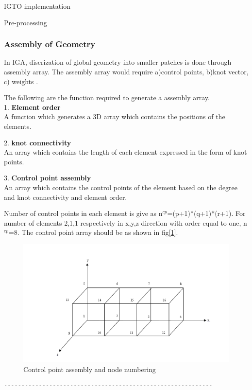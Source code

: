 \documentclass[a4paper,12pt,times]{article}
\begin{document}
\begin{section}{IGTO implementation}
\begin{subsection}{Pre-processing}
\subsubsection{Assembly of Geometry}
In IGA, discrization of global geometry into smaller patches is done through assembly array. The assembly array would require a)control points, b)knot vector, c) weights .

The following are the function required to generate a assembly array.\\

1.\textbf{ Element order}\\
A function which generates a 3D array which contains the positions of the elements.


2.\textbf{ knot connectivity}\\
An array which contains the length of each element expressed in the form of knot points.

3.\textbf{ Control point assembly}\\
An array which contains the control points of the element based on the degree and knot connectivity and element order.
 
Number of control points in each element is give as n$^{cp}$=(p+1)*(q+1)*(r+1).
For number of elements 2,1,1 respectively in x,y,z direction with order equal to one, n$^{cp}$=8. The control point array should be as shown in fig[\ref{fig:Control point assembly and node numbering}].
 
\begin{figure}[h!]
\centering
\includegraphics[width=\linewidth]{element numbering.png}
\caption{Control point assembly and node numbering}
\label{fig:Control point assembly and node numbering}
\end{figure}
\begin{verbatim}
------------------------------------------------------------


\end{verbatim}
\end{subsection}
\end{section}
\end{document}
